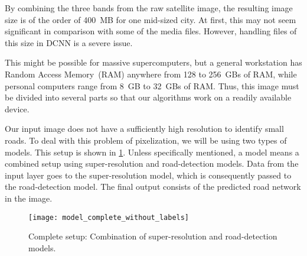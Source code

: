 By combining the three bands from the raw satellite image, the resulting image size is of the order of 400~MB for one mid-sized city. At first, this may not seem significant in comparison with some of the media files. However, handling files of this size in DCNN is a severe issue. 

This might be possible for massive supercomputers, but a general workstation has Random Access Memory~(RAM) anywhere from 128 to 256~GBs of RAM, while personal computers range from 8~GB to 32~GBs of RAM. Thus, this image must be divided into several parts so that our algorithms work on a readily available device.

Our input image does not have a sufficiently high resolution to identify small roads. To deal with this problem of pixelization, we will be using two types of models. This setup is shown in \cref{fig:model_complete_without_labels}. Unless specifically mentioned, a model means a combined setup using super-resolution and road-detection models. Data from the input layer goes to the super-resolution model, which is consequently passed to the road-detection model. The final output consists of the predicted road network in the image.

\begin{figure}[h!]
  \centering
  \texttt{[image: model\_complete\_without\_labels]}
  \caption{Complete setup: Combination of super-resolution and road-detection models.}
  \label{fig:model_complete_without_labels}
\end{figure}
